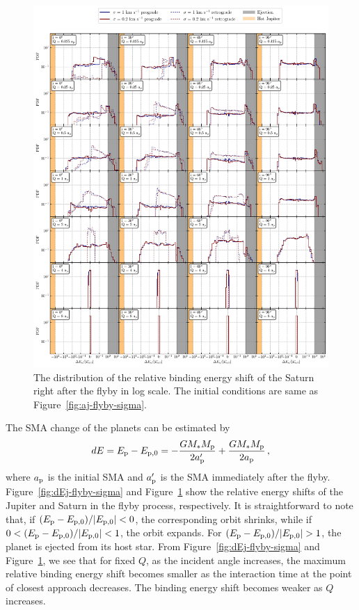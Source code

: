 \documentclass[twocolumn]{aastex63}
\newcommand*\fgr[1]{Figure~\ref{#1}}
\begin{document}
\begin{figure}
    \includegraphics[width=\textwidth]{figs/dEs-flyby-sigma.pdf}
    \caption{The distribution of the relative binding energy shift of the Saturn right after the flyby in log scale.  The initial conditions are same as \fgr{fig:aj-flyby-sigma}.}  
    \label{fig:dEs-flyby-sigma}
\end{figure}

The SMA change of the planets can be estimated by 
\begin{equation}
    dE = E_{\rm p } - E_{\rm p ,0} = -\frac{GM_*M_{\rm p}}{2a_{\rm p}^\prime} + \frac{GM_*M_{\rm p}}{2a_{\rm p}}\,,
\end{equation}
where $a_{\rm p}$ is the initial SMA and $a_{\rm p}^\prime$ is the SMA immediately after the flyby. \fgr{fig:dEj-flyby-sigma} and \fgr{fig:dEs-flyby-sigma} show the relative energy shifts of the Jupiter and Saturn in the flyby process, respectively. It is straightforward to note that, if $(E_{\rm p} - E_{\rm p,0})/|E_{\rm p,0}| < 0$, the corresponding orbit shrinks, while if $0 < (E_{\rm p} - E_{\rm p,0})/|E_{\rm p,0}| < 1$, the orbit expands. For $(E_{\rm p} - E_{\rm p,0})/|E_{\rm p,0}| > 1$, the planet is ejected from its host star. From \fgr{fig:dEj-flyby-sigma} and \fgr{fig:dEs-flyby-sigma}, we see that for fixed $Q$, as the incident angle increases, the maximum relative binding energy shift becomes smaller as the interaction time at the point of closest approach decreases. The binding energy shift becomes weaker as $Q$ increases.
\end{document}
